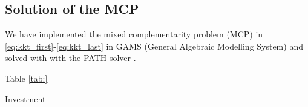 \subsection{Solution of the MCP}

We have implemented the mixed complementarity problem (MCP) in \eqref{eq:kkt_first}-\eqref{eq:kkt_last} in GAMS (General Algebraic Modelling System) and solved with with the PATH solver \citep[see][]{Ferris2000}.

Table \ref{tab:}

\begin{table}[htb]
  \centering
  \caption{Investment}
  \vspace{0.3cm}
  \begin{tabular}{rrr}
    
  \end{tabular}
\end{table}


